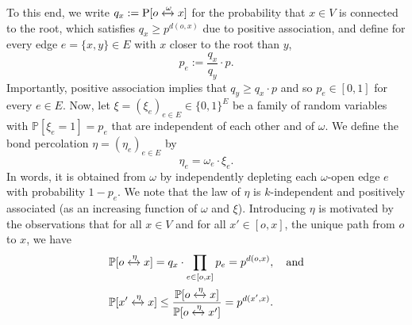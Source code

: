 \documentclass[11pt]{article}
\renewcommand{\P}{\mathrm{P}}
\theoremstyle{remark}
\begin{document}
To this end, we write $q_x := \P[o \xleftrightarrow{\omega}x]$ for the probability that  $x \in V$ is connected to the root, which satisfies $q_x \ge p^{d(o,x)}$ due to positive association, and define for every edge $e=\{x,y\} \in E$ with $x$ closer to the root than $y$, 
\begin{equation}
	p_e := \frac{q_x}{q_y} \cdot p.
\end{equation}
Importantly, positive association implies that $q_y \ge q_x \cdot p$ and so $p_e \in [0,1]$ for every  $e \in E$. 
Now, let $\xi = (\xi_e)_{e \in E } \in \{0,1\}^E$ be a family of random variables with $\mathbb P[\xi_e = 1] = p_e$ that are independent of each other and of $\omega$. We define the bond percolation $\eta = (\eta_e)_{e\in E}$ by 
\begin{equation}
	\eta_e = \omega_e \cdot \xi_e.
\end{equation}
In words, it is obtained from $\omega$ by independently depleting each $\omega$-open edge $e$ with probability $1-p_e$. 
We note that the law of $\eta$ is $k$-independent and positively associated (as an increasing function of $\omega$ and $\xi$). Introducing $\eta$ is motivated by the observations that for all $x \in V$ and for all $x' \in [o,x]$, the unique path from $o$ to $x$, we have
\begin{align} \label{eq:9}
	 &\mathbb P[o \xleftrightarrow{\eta} x] = q_x \cdot \prod_{e \in [o,x]} p_e = p^{d(o,x)}, \quad \text{and}\\ 
	\label{eq:10}
  &\mathbb P[x' \xleftrightarrow{\eta} x] \le \frac{\mathbb P[o \xleftrightarrow{\eta} x]}{\mathbb P[o \xleftrightarrow{\eta} x']} = p^{d(x',x)}.
\end{align}
\end{document}
